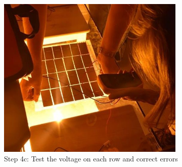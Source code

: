 \documentclass{article}
\theoremstyle{definition}
\theoremstyle{definition}
\theoremstyle{remark}
\begin{document}
\begin{figure}[!ht]
\begin{minipage}{0.25\textwidth}
        \includegraphics[width=0.8\textwidth]{../Images/image_3_6_(step_4c).png}
        \caption*{Step 4c: Test the voltage on each row and correct errors}
    \end{minipage}
  \end{figure}
\end{document}
